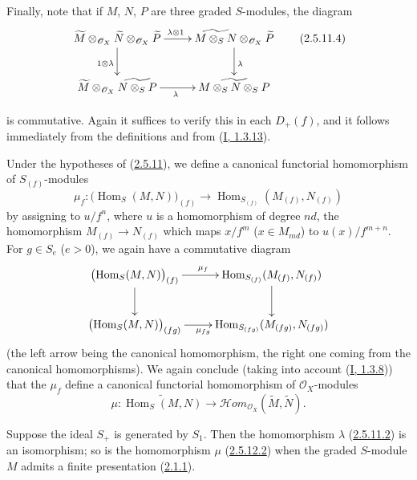\begin{env}[2.5.11]
Finally, note that if $M$, $N$, $P$ are three graded $S$-modules, the
diagram
\[
\label{II.2.5.11.4}
  \xymatrix{
    \widetilde{M}\otimes_{\mathcal{O}_X}\widetilde{N}
    \otimes_{\mathcal{O}_X}\widetilde{P}
    \ar[r]^{\lambda\otimes1}\ar[d]_{1\otimes\lambda}
    & \widetilde{M\otimes_S N}\otimes_{\mathcal{O}_X}\widetilde{P}
    \ar[d]^\lambda\\
    \widetilde{M}\otimes_{\mathcal{O}_X}\widetilde{N\otimes_S P}
    \ar[r]_\lambda
    & \widetilde{M\otimes_S N\otimes_S P}
  }
\tag{2.5.11.4}
\]

is commutative. Again it suffices to verify this in each $D_+(f)$, and
it follows immediately from the definitions and from
(\hyperref[I.1.3.13]{I, 1.3.13}).
\end{env}

\begin{env}[2.5.12]
\label{II.2.5.12}
Under the hypotheses of (\hyperref[II.2.5.11]{2.5.11}), we define a
canonical functorial homomorphism of $S_{(f)}$-modules
\[
\label{II.2.5.12.1}
  \mu_f:\bigl(\operatorname{Hom}_S(M,N)\bigr)_{(f)}
  \longrightarrow
  \operatorname{Hom}_{S_{(f)}}(M_{(f)},N_{(f)})
\tag{2.5.12.1}
\]
by assigning to $u/f^n$, where $u$ is a homomorphism of degree
$nd$, the homomorphism $M_{(f)}\to N_{(f)}$ which maps $x/f^m$
($x\in M_{md}$) to $u(x)/f^{m+n}$. For $g\in S_e$ ($e>0$), we again have
a commutative diagram
\[
  \xymatrix{
    \bigl(\operatorname{Hom}_S(M,N)\bigr)_{(f)}
    \ar[r]^{\mu_f}\ar[d]
    & \operatorname{Hom}_{S_{(f)}}(M_{(f)},N_{(f)})\ar[d]\\
    \bigl(\operatorname{Hom}_S(M,N)\bigr)_{(fg)}
    \ar[r]_{\mu_{fg}}
    & \operatorname{Hom}_{S_{(fg)}}(M_{(fg)},N_{(fg)})
  }
\]
(the left arrow being the canonical homomorphism, the right one
coming from the canonical homomorphisms). We again conclude (taking into
account (\hyperref[I.1.3.8]{I, 1.3.8})) that the $\mu_f$ define a
canonical functorial homomorphism of $\mathcal{O}_X$-modules
\[
\label{II.2.5.12.2}
  \mu:\widetilde{\operatorname{Hom}_S(M,N)}
  \longrightarrow
  \mathcal{H}om_{\mathcal{O}_X}(\widetilde{M},\widetilde{N}).
\tag{2.5.12.2}
\]
\end{env}

\begin{proposition}[2.5.13]
\label{II.2.5.13}
Suppose the ideal $S_+$ is generated by $S_1$. Then the homomorphism
$\lambda$ (\hyperref[II.2.5.11.2]{2.5.11.2}) is an isomorphism; so is
the homomorphism $\mu$
(\hyperref[II.2.5.12.2]{2.5.12.2}) when the graded $S$-module $M$
admits a finite presentation (\hyperref[II.2.1.1]{2.1.1}).
\end{proposition}

